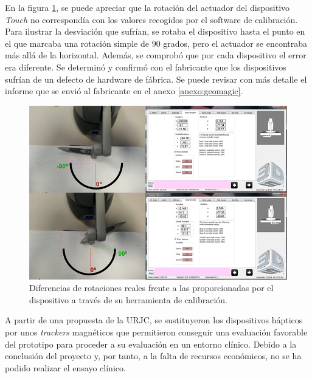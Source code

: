 En la figura \ref{fig:errorhaptic}, se puede apreciar que la rotación del actuador del dispositivo \emph{Touch}  no correspondía con los valores recogidos por el software de calibración. Para ilustrar la desviación que sufrían, se rotaba el dispositivo hasta el punto en el que marcaba una rotación simple de $90$ grados, pero el actuador se encontraba más allá de la horizontal. Además, se comprobó que por cada dispositivo el error era diferente. Se determinó y confirmó con el fabricante que los dispositivos sufrían de un defecto de hardware de fábrica. Se puede revisar con más detalle el informe que se envió al fabricante en el anexo \ref{anexo:geomagic}.


\begin{figure}[ht]
\centering
\includegraphics[width=0.9\linewidth]{IMG/errorhaptic.png}
\caption{\label{fig:errorhaptic}Diferencias de rotaciones reales frente a las proporcionadas por el dispositivo a través de su herramienta de calibración.}
\end{figure}



A partir de una propuesta de la \ac{URJC}, se sustituyeron los dispositivos hápticos por unos \emph{\acs{tracker}s} magnéticos que permitieron conseguir una evaluación favorable del prototipo para proceder a su evaluación  en un entorno clínico. Debido a la conclusión del proyecto y, por tanto, a la falta de recursos económicos, no se ha podido realizar el ensayo clínico.



